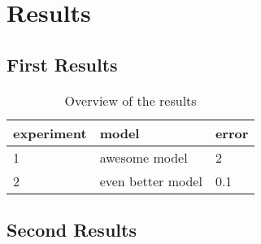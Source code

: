 \chapter{Results}%
\label{ch:results}%
\lipsum%
\section{First Results}%
\label{sec:results1}%
\lipsum%
\begin{table}
	\centering
	\begin{tabular}{@{}lll@{}}
		\toprule
		experiment & model   & error \\ \midrule
		1        & awesome model & 2       \\
		2        & even better model & 0.1       \\ \bottomrule
	\end{tabular}
	\caption[Results]{Overview of the results}
	\label{tab:results}	
\end{table}
\section{Second Results}%
\label{sec:results2}%
\lipsum%